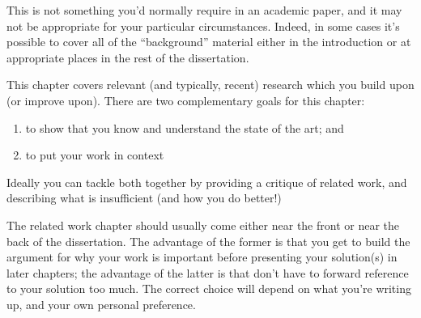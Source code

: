 This is not something you'd normally require in an academic paper, 
and it may not be appropriate for your particular circumstances. 
Indeed, in some cases it's possible to cover all of the ``background'' 
material either in the introduction or at appropriate places in 
the rest of the dissertation. 

\newpage

This chapter covers relevant (and typically, recent) research 
which you build upon (or improve upon). There are two complementary 
goals for this chapter: 
\begin{enumerate} 
  \item to show that you know and understand the state of the art; and 
  \item to put your work in context
\end{enumerate} 

Ideally you can tackle both together by providing a critique of
related work, and describing what is insufficient (and how you do
better!)

The related work chapter should usually come either near the front or
near the back of the dissertation. The advantage of the former is that
you get to build the argument for why your work is important before
presenting your solution(s) in later chapters; the advantage of the
latter is that don't have to forward reference to your solution too
much. The correct choice will depend on what you're writing up, and
your own personal preference.